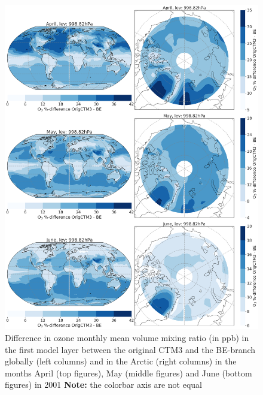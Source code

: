 \begin{figure}[h]
    \centering
    \includegraphics[width = \linewidth]{Chapter6_Results/images/Orig_BE_comp/BE_origPD_vmr_lev0_AprJune_2001.png}
    \caption{Difference in ozone monthly mean volume mixing ratio (in ppb) in the first model layer between the original CTM3 and the BE-branch globally (left columns) and in the Arctic (right columns) in the months April (top figures), May (middle figures) and June (bottom figures) in 2001 \textbf{Note:} the colorbar axis are not equal}
    \label{fig:BE_origPD_vmr_AprJun}
\end{figure}



